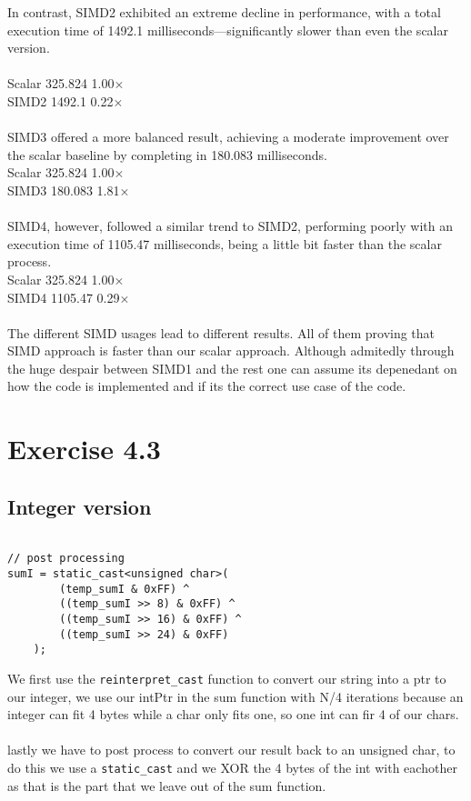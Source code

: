\documentclass[a4paper]{article}
\begin{document}
In contrast, SIMD2 exhibited an extreme decline in performance, with a total execution time of 1492.1 milliseconds—significantly slower than even the scalar version.\\
\\
Scalar	325.824	1.00×\\
SIMD2	1492.1	0.22×\\
\\
SIMD3 offered a more balanced result, achieving a moderate improvement over the scalar baseline by completing in 180.083 milliseconds.\\
Scalar	325.824	1.00×\\
SIMD3	180.083	1.81×\\
\\

SIMD4, however, followed a similar trend to SIMD2, performing poorly with an execution time of 1105.47 milliseconds, being a little bit faster than the scalar process. \\
Scalar	325.824	1.00×\\
SIMD4	1105.47	0.29×\\
\\

The different SIMD usages lead to different results. All of them proving that SIMD approach is faster than our scalar approach. Although admitedly through the huge despair between SIMD1 and the rest one can assume its depenedant on how the code is implemented and if its the correct use case of the code. 

\section*{Exercise 4.3}
\subsection*{Integer version}
\begin{lstlisting}

// post processing
sumI = static_cast<unsigned char>(
        (temp_sumI & 0xFF) ^
        ((temp_sumI >> 8) & 0xFF) ^
        ((temp_sumI >> 16) & 0xFF) ^
        ((temp_sumI >> 24) & 0xFF)
    );
\end{lstlisting} 
We first use the \verb|reinterpret_cast| function to convert our string into a ptr to our integer, we use our intPtr in the sum function with N/4 iterations because an integer can fit 4 bytes while a char only fits one, so one int can fir 4 of our chars.\\
\\
lastly we have to post process to convert our result back to an unsigned char, to do this we use a \verb|static_cast| and we XOR the 4 bytes of the int with eachother as that is the part that we leave out of the sum function.
\end{document}
